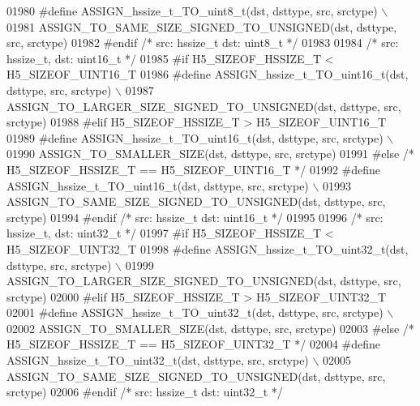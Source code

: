 \begin{DoxyCode}
01980 \textcolor{preprocessor}{    #define ASSIGN\_hssize\_t\_TO\_uint8\_t(dst, dsttype, src, srctype) \(\backslash\)}
01981 \textcolor{preprocessor}{        ASSIGN\_TO\_SAME\_SIZE\_SIGNED\_TO\_UNSIGNED(dst, dsttype, src, srctype)}
01982 \textcolor{preprocessor}{#endif }\textcolor{comment}{/* src: hssize\_t dst: uint8\_t */}\textcolor{preprocessor}{}
01983 
01984 \textcolor{comment}{/* src: hssize\_t, dst: uint16\_t */}
01985 \textcolor{preprocessor}{#if H5\_SIZEOF\_HSSIZE\_T < H5\_SIZEOF\_UINT16\_T}
01986 \textcolor{preprocessor}{    #define ASSIGN\_hssize\_t\_TO\_uint16\_t(dst, dsttype, src, srctype) \(\backslash\)}
01987 \textcolor{preprocessor}{        ASSIGN\_TO\_LARGER\_SIZE\_SIGNED\_TO\_UNSIGNED(dst, dsttype, src, srctype)}
01988 \textcolor{preprocessor}{#elif H5\_SIZEOF\_HSSIZE\_T > H5\_SIZEOF\_UINT16\_T}
01989 \textcolor{preprocessor}{    #define ASSIGN\_hssize\_t\_TO\_uint16\_t(dst, dsttype, src, srctype) \(\backslash\)}
01990 \textcolor{preprocessor}{        ASSIGN\_TO\_SMALLER\_SIZE(dst, dsttype, src, srctype)}
01991 \textcolor{preprocessor}{#else }\textcolor{comment}{/* H5\_SIZEOF\_HSSIZE\_T == H5\_SIZEOF\_UINT16\_T */}\textcolor{preprocessor}{}
01992 \textcolor{preprocessor}{    #define ASSIGN\_hssize\_t\_TO\_uint16\_t(dst, dsttype, src, srctype) \(\backslash\)}
01993 \textcolor{preprocessor}{        ASSIGN\_TO\_SAME\_SIZE\_SIGNED\_TO\_UNSIGNED(dst, dsttype, src, srctype)}
01994 \textcolor{preprocessor}{#endif }\textcolor{comment}{/* src: hssize\_t dst: uint16\_t */}\textcolor{preprocessor}{}
01995 
01996 \textcolor{comment}{/* src: hssize\_t, dst: uint32\_t */}
01997 \textcolor{preprocessor}{#if H5\_SIZEOF\_HSSIZE\_T < H5\_SIZEOF\_UINT32\_T}
01998 \textcolor{preprocessor}{    #define ASSIGN\_hssize\_t\_TO\_uint32\_t(dst, dsttype, src, srctype) \(\backslash\)}
01999 \textcolor{preprocessor}{        ASSIGN\_TO\_LARGER\_SIZE\_SIGNED\_TO\_UNSIGNED(dst, dsttype, src, srctype)}
02000 \textcolor{preprocessor}{#elif H5\_SIZEOF\_HSSIZE\_T > H5\_SIZEOF\_UINT32\_T}
02001 \textcolor{preprocessor}{    #define ASSIGN\_hssize\_t\_TO\_uint32\_t(dst, dsttype, src, srctype) \(\backslash\)}
02002 \textcolor{preprocessor}{        ASSIGN\_TO\_SMALLER\_SIZE(dst, dsttype, src, srctype)}
02003 \textcolor{preprocessor}{#else }\textcolor{comment}{/* H5\_SIZEOF\_HSSIZE\_T == H5\_SIZEOF\_UINT32\_T */}\textcolor{preprocessor}{}
02004 \textcolor{preprocessor}{    #define ASSIGN\_hssize\_t\_TO\_uint32\_t(dst, dsttype, src, srctype) \(\backslash\)}
02005 \textcolor{preprocessor}{        ASSIGN\_TO\_SAME\_SIZE\_SIGNED\_TO\_UNSIGNED(dst, dsttype, src, srctype)}
02006 \textcolor{preprocessor}{#endif }\textcolor{comment}{/* src: hssize\_t dst: uint32\_t */}\textcolor{preprocessor}{}

\end{DoxyCode}
